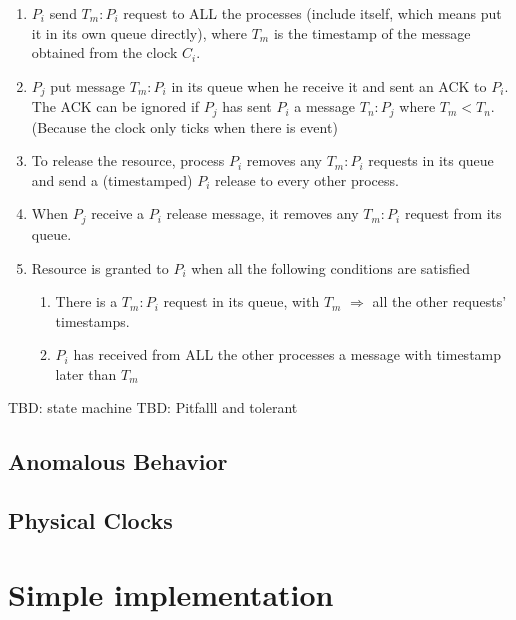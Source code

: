 \documentclass[12pt,a4paper,oneside]{article}
\begin{document}
\begin{enumerate}
  \item $P_i$ send $T_m:P_i$ request to ALL the processes (include itself, which means put it in its own queue directly),
  where $T_m$ is the timestamp of the message obtained from the clock $C_i$.
  \item $P_j$ put message $T_m:P_i$ in its queue when he receive it and sent an ACK to $P_i$. The ACK can be ignored if
  $P_j$ has sent $P_i$ a message $T_n:P_j$ where $T_m < T_n$. (Because the clock only ticks when there is event)
  \item To release the resource, process $P_i$ removes any $T_m:P_i$ requests in its queue and send a (timestamped) $P_i$
  release to every other process\cite{l}.
  \item When $P_j$ receive a $P_i$ release message, it removes any $T_m:P_i$ request from its queue.
  \item Resource is granted to $P_i$ when all the following conditions are satisfied
  \begin{enumerate}
    \item There is a $T_m:P_i$ request in its queue, with $T_m$ $\Rightarrow$ all the other requests' timestamps.
    \item $P_i$ has received from ALL the other processes a message with timestamp later than $T_m$
  \end{enumerate}
\end{enumerate}

TBD: state machine
TBD: Pitfalll and tolerant

\subsection{Anomalous Behavior}

\subsection{Physical Clocks}

\section{Simple implementation}
\end{document}
